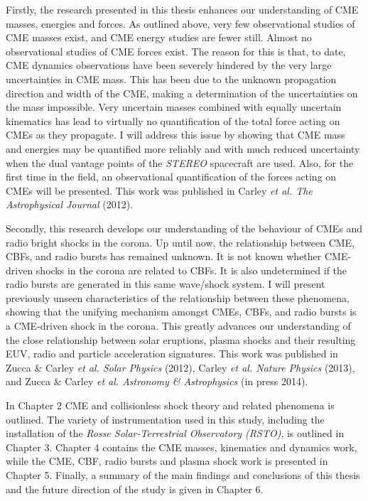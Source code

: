 Firstly, the research presented in this thesis enhances our understanding of CME masses, energies and forces. As outlined above, very few observational studies of CME masses exist, and CME energy studies are fewer still. Almost no observational studies of CME forces exist. The reason for this is that, to date, CME dynamics observations have been severely hindered by the very large uncertainties in CME mass. This has been due to the unknown propagation direction and width of the CME, making a determination of the uncertainties on the mass impossible. Very uncertain masses combined with equally uncertain kinematics has lead to virtually no quantification of the total force acting on CMEs as they propagate. I will address this issue by showing that CME mass and energies may be quantified more reliably and with much reduced uncertainty when the dual vantage points of the \emph{STEREO} spacecraft are used. Also, for the first time in the field, an observational quantification of the forces acting on CMEs will be presented. This work was published in Carley \emph{et al. The Astrophysical Journal} (2012).

Secondly, this research develops our understanding of the behaviour of CMEs and radio bright shocks in the corona. Up until now, the relationship between CME, CBFs, and radio bursts has remained unknown. It is not known whether CME-driven shocks in the corona are related to CBFs. It is also undetermined if the radio bursts are generated in this same wave/shock system. I will present previously unseen characteristics of the
relationship between these phenomena, showing that the unifying mechanism amongst CMEs, CBFs, and radio bursts is a CME-driven shock in the corona. This greatly advances our understanding of the close relationship between solar eruptions, plasma shocks and their resulting EUV, radio and particle acceleration signatures. This work was published in Zucca \& Carley \emph{et al. Solar Physics} (2012), Carley \emph{et al. Nature Physics} (2013), and Zucca \& Carley \emph{et al. Astronomy \& Astrophysics} (in press 2014).

In Chapter 2 CME and collisionless shock theory and related phenomena is outlined. The variety of instrumentation used in this study, including the installation of the \emph{Rosse Solar-Terrestrial Observatory (RSTO)}, is outlined in Chapter 3. Chapter 4 contains the CME masses, kinematics and dynamics work, while the CME, CBF, radio bursts and plasma shock work is presented in Chapter 5. Finally, a summary of the main findings and conclusions of this thesis and the future direction of the study is given in Chapter 6.
